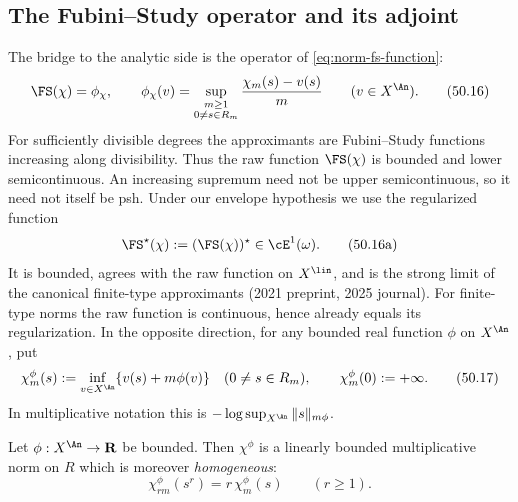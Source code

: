 \subsection{The Fubini--Study operator and its adjoint}
\label{sec:ch50-fs-adjoint}

The bridge to the analytic side is the operator of
\eqref{eq:norm-fs-function}:
\[
 \FS(\chi)=\phi_\chi,\qquad
 \phi_\chi(v)=\sup_{\substack{m\geq1\\0\ne s\in R_m}}
        \frac{\chi_m(s)-v(s)}{m}
 \qquad(v\in X^{\An}).
\tag{50.16}\label{eq:ch50-fs-operator}
\]
For sufficiently divisible degrees the approximants are Fubini--Study
functions increasing along divisibility.  Thus the raw function $\FS(\chi)$
is bounded and lower semicontinuous.  An increasing supremum need not be
upper semicontinuous, so it need not itself be psh.  Under our envelope
hypothesis we use the regularized function
\[
 \FS^\star(\chi):=(\FS(\chi))^\star\in\cE^1(\omega).
\tag{50.16a}\label{eq:ch50-regularized-fs}
\]
It is bounded, agrees with the raw function on $X^{\lin}$, and is the
strong limit of the canonical finite-type approximants
\cite[Lemma~6.17 and Theorem~6.29]{BJKS1} (2021 preprint, 2025 journal).
For finite-type norms the raw function is continuous, hence already equals
its regularization.  In the opposite direction, for any bounded real
function $\phi$ on $X^{\An}$, put
\[
 \chi^\phi_m(s):=\inf_{v\in X^{\An}}\{v(s)+m\phi(v)\}
 \quad(0\ne s\in R_m),\qquad \chi^\phi_m(0):=+\infty.
\tag{50.17}\label{eq:ch50-supnorm}
\]
In multiplicative notation this is
$-\log\sup_{X^{\An}}\|s\|_{m\phi}$.

\begin{proposition}
\label{prop:ch50-supnorm}
Let $\phi:X^{\An}\to\mathbf R$ be bounded.  Then $\chi^\phi$ is a linearly
bounded multiplicative norm on $R$ which is moreover
\emph{homogeneous}:
\[
 \chi^\phi_{rm}(s^r)=r\,\chi^\phi_m(s)\qquad(r\ge1).
\tag{50.18}\label{eq:ch50-supnorm-homog}
\]
\end{proposition}

